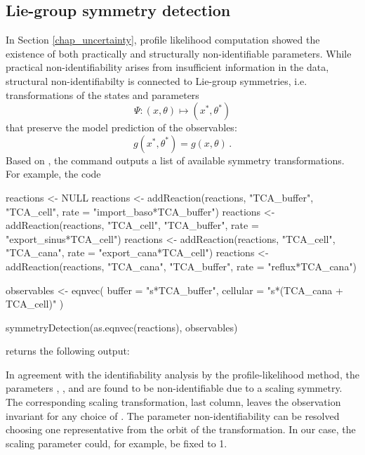 \documentclass[article]{jss}
\begin{document}
\subsection{Lie-group symmetry detection}
In Section \ref{chap_uncertainty}, profile likelihood computation showed the existence of both practically and structurally non-identifiable parameters. While practical non-identifiability arises from insufficient information in the data, structural non-identifiabilty is connected to Lie-group symmetries, i.e. transformations of the states and parameters \[\Psi: (x,\theta) \longmapsto (x^*, \theta^*)\] that preserve the model prediction of the observables: \[g(x^*, \theta^*) = g(x,\theta)\,.\] Based on \citep{merkt2015higher}, the  command outputs a list of available symmetry transformations. For example, the code
\begin{CodeChunk}
\begin{CodeInput}
reactions <- NULL
reactions <- addReaction(reactions, "TCA_buffer", "TCA_cell", 
			 rate = "import_baso*TCA_buffer")
reactions <- addReaction(reactions, "TCA_cell", "TCA_buffer", 
			 rate = "export_sinus*TCA_cell")
reactions <- addReaction(reactions, "TCA_cell", "TCA_cana", 
			 rate = "export_cana*TCA_cell")
reactions <- addReaction(reactions, "TCA_cana", "TCA_buffer", 
			 rate = "reflux*TCA_cana")

observables <- eqnvec(
  buffer = "s*TCA_buffer",
  cellular = "s*(TCA_cana + TCA_cell)"
)

symmetryDetection(as.eqnvec(reactions), observables)
\end{CodeInput}
\end{CodeChunk}
returns the following output:
\begin{CodeChunk}
\end{CodeChunk}


In agreement with the identifiability analysis by the profile-likelihood method, the parameters , ,  and  are found to be non-identifiable due to a scaling symmetry. The corresponding scaling transformation, last column, leaves the observation invariant for any choice of . The parameter non-identifiability can be resolved choosing one representative from the orbit of the transformation. In our case, the scaling parameter could, for example, be fixed to 1. 
\end{document}
